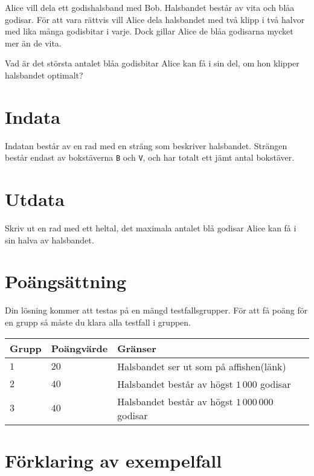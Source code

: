 Alice vill dela ett godishalsband med Bob.
Halsbandet består av vita och blåa godisar.
För att vara rättvis vill Alice dela halsbandet med
två klipp i två halvor med lika många godisbitar i varje.
Dock gillar Alice de blåa godisarna mycket mer än de vita.

Vad är det största antalet blåa godisbitar Alice kan få i sin del,
om hon klipper halsbandet optimalt?

\section*{Indata}
Indatan består av en rad med en sträng som beskriver halsbandet.
Strängen består endast av bokstäverna \texttt{B} och \texttt{V},
och har totalt ett jämt antal bokstäver.

\section*{Utdata}
Skriv ut en rad med ett heltal, det maximala antalet blå godisar Alice
kan få i sin halva av halsbandet.

\section*{Poängsättning}
Din lösning kommer att testas på en mängd testfallsgrupper.
För att få poäng för en grupp så måste du klara alla testfall i gruppen.

\noindent
\begin{tabular}{| l | l | l |}
\hline
Grupp & Poängvärde & Gränser \\ \hline
$1$   & $20$       & Halsbandet ser ut som på affishen(länk) \\ \hline
$2$   & $40$       & Halsbandet består av högst $1\,000$ godisar\\ \hline
$3$   & $40$       & Halsbandet består av högst $1\,000\,000$ godisar \\ \hline
\end{tabular}

\section*{Förklaring av exempelfall}

